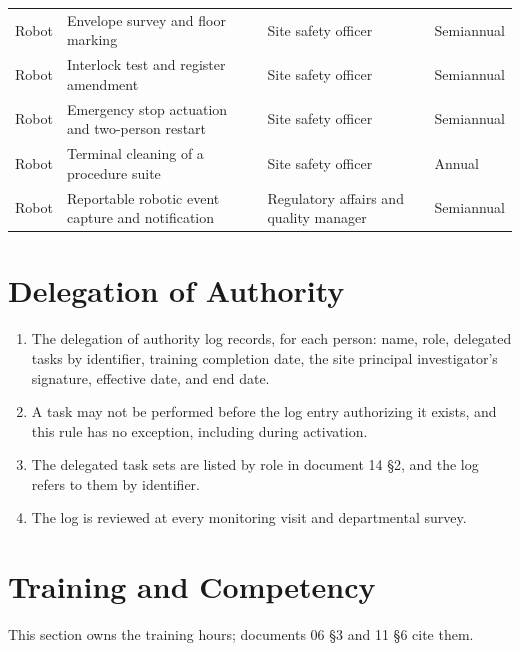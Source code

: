 \begin{mvltable}
\begin{xltabular}{\textwidth}{>{\raggedright\arraybackslash}p{2.1cm} >{\raggedright\arraybackslash}p{4.3cm} >{\raggedright\arraybackslash}p{2.9cm} >{\raggedright\arraybackslash}X}
Robot & Envelope survey and floor marking & Site safety officer & Semiannual \\
Robot & Interlock test and register amendment & Site safety officer & Semiannual \\
Robot & Emergency stop actuation and two-person restart & Site safety officer & Semiannual \\
Robot & Terminal cleaning of a procedure suite & Site safety officer & Annual \\
Robot & Reportable robotic event capture and notification & Regulatory affairs and quality manager & Semiannual \\
\end{xltabular}
\end{mvltable}

\section{Delegation of Authority}

\begin{enumerate}
\item The delegation of authority log records, for each person: name, role,
  delegated tasks by identifier, training completion date, the site principal
  investigator's signature, effective date, and end date.

\item A task may not be performed before the log entry authorizing it exists,
  and this rule has no exception, including during activation.

\item The delegated task sets are listed by role in document 14 §2, and the log
  refers to them by identifier.

\item The log is reviewed at every monitoring visit and departmental survey.
\end{enumerate}

\section{Training and Competency}

This section owns the training hours; documents 06 §3 and 11 §6 cite them.

